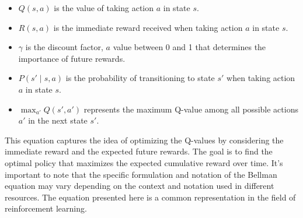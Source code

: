 \begin{itemize}

\item {\bf $ Q(s, a) $ } is the value of taking action $a$ in state $s$.
\item {\bf $ R(s, a) $ } is the immediate reward received when taking action $a$ in state $s$.
\item {\bf $\gamma$ } is the discount factor, $a$ value between 0 and 1 that determines the importance of future rewards.
\item {\bf $ P(s' \mid s, a) $ } is the probability of transitioning to state $s'$ when taking action $a$ in state $s$.
\item {\bf $ \max_{a'} Q(s', a') $ } represents the maximum Q-value among all possible actions $a'$ in the next state $s'$.
\end{itemize}


\begin{textblock}
This equation captures the idea of optimizing the Q-values by considering the immediate reward and the expected future rewards. The goal is to find the optimal policy that maximizes the expected cumulative reward over time.
It's important to note that the specific formulation and notation of the Bellman equation may vary depending on the context and notation used in different resources. The equation presented here is a common representation in the field of reinforcement learning.
\end{textblock}




